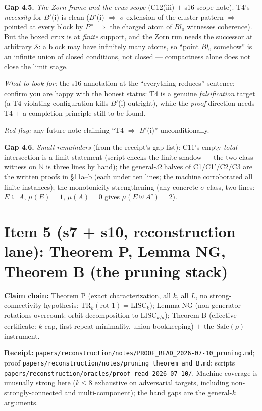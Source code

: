 \documentclass[11pt]{article}
\newcommand{\file}[1]{\texttt{\small #1}}
\newcommand{\gap}[1]{\medskip\noindent\textbf{Gap #1.}}
\newcommand{\lookfor}{\par\smallskip\noindent\emph{What to look for:} }
\newcommand{\redflag}{\par\smallskip\noindent\emph{Red flag:} }
\begin{document}
\gap{4.5} \emph{The Zorn frame and the crux scope} (C12(iii) $+$ s16
scope note). T4's \emph{necessity} for $B'$(i) is clean ($B'$(i)
$\Rightarrow$ $\sigma$-extension of the cluster-pattern
$\Rightarrow$ pointed at every block by $P^=$ $\Rightarrow$ the
charged atom of $Bl_0$ witnesses coherence). But the boxed crux is at
\emph{finite} support, and the Zorn run needs the successor at
arbitrary $\mathcal S$: a block may have infinitely many atoms, so
``point $Bl_0$ somehow'' is an infinite union of closed conditions,
not closed --- compactness alone does not close the limit stage.
\lookfor the s16 annotation at the ``everything reduces'' sentence;
confirm you are happy with the honest status: T4 is a genuine
\emph{falsification} target (a T4-violating configuration kills
$B'$(i) outright), while the \emph{proof} direction needs T4 $+$ a
completion principle still to be found.
\redflag any future note claiming ``T4 $\Rightarrow$ $B'$(i)''
unconditionally.

\gap{4.6} \emph{Small remainders} (from the receipt's gap list):
C11's empty \emph{total} intersection is a limit statement (script
checks the finite shadow --- the two-class witness on $\mathbb N$ is
three lines by hand); the general-$\Omega$ halves of C1/C1$'$/C2/C3
are the written proofs in \S11a--b (each under ten lines; the machine
corroborated all finite instances); the monotonicity strengthening
(any concrete $\sigma$-class, two lines: $E \subseteq A$, $\mu(E) =
1$, $\mu(A) = 0$ gives $\mu(E \uplus A^c) = 2$).

\section{Item 5 (s7 + s10, reconstruction lane): Theorem P, Lemma NG,
Theorem B (the pruning stack)}

\noindent\textbf{Claim chain:} Theorem P (exact characterization,
all $k$, all $L$, no strong-connectivity hypothesis:
$\mathrm{TR}_k(\text{rot-1}) = \mathrm{LISC}_k$); Lemma NG
(non-generator rotations overcount: orbit decomposition to
$\mathrm{LISC}_{k/d}$); Theorem B (effective certificate: $k$-cap,
first-repeat minimality, union bookkeeping) $+$ the
$\mathrm{Safe}(\rho)$ instrument.

\noindent\textbf{Receipt:}
\file{papers/reconstruction/notes/PROOF\_READ\_2026-07-10\_pruning.md};
proof \file{papers/reconstruction/notes/pruning\_theorem\_and\_B.md};
scripts \file{papers/reconstruction/oracles/proof\_read\_2026-07-10/}.
Machine coverage is unusually strong here ($k \le 8$ exhaustive on
adversarial targets, including non-strongly-connected and
multi-component); the hand gaps are the general-$k$ arguments.
\end{document}
